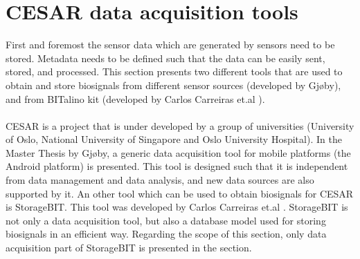 \section{CESAR data acquisition tools}
    First and foremost the sensor data which are generated by sensors need to be stored. Metadata needs to be defined such that the data can be easily sent, stored, and processed. This section presents two different tools that are used to obtain and store biosignals from different sensor sources (developed by Gjøby\citep{SP}), and from BITalino kit (developed by Carlos Carreiras et.al \citep{StorageBIT}).\\\\
    CESAR is a project that is under developed by a group of universities (University of Oslo, National University of Singapore and Oslo University Hospital). In the Master Thesis by Gjøby\citep{SP}, a generic data acquisition tool for mobile platforms (the Android platform) is presented. This tool is designed such that it is independent from data management and data analysis, and new data sources are also supported by it. An other tool which can be used to obtain biosignals for CESAR is StorageBIT. This tool was developed by Carlos Carreiras et.al \citep{StorageBIT}. StorageBIT is not only a data acquisition tool, but also a database model used for storing biosignals in an efficient way. Regarding the scope of this section, only data acquisition part of StorageBIT is presented in the section.
